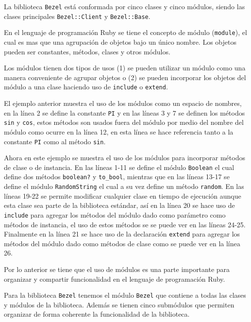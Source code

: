 La biblioteca \texttt{Bezel} está conformada por cinco clases y cinco módulos,
siendo las clases principales \texttt{Bezel::Client} y \texttt{Bezel::Base}.

En el lenguaje de programación Ruby se tiene el concepto de módulo (\texttt{module}),
el cual es mas que una agrupación de objetos bajo un único nombre. Los objetos
pueden ser constantes, métodos, clases y otros módulos.

Los módulos tienen dos tipos de usos (1) se pueden utilizar un módulo como una
manera conveniente de agrupar objetos o (2) se pueden incorporar los objetos del
módulo a una clase haciendo uso de \texttt{include} o \texttt{extend}.



El ejemplo anterior muestra el uso de los módulos como un espacio de nombres,
en la línea 2 se define la constante \texttt{PI} y en las líneas 3 y 7 se definen
los métodos \texttt{sin} y \texttt{cos}, estos métodos son usados fuera del
módulo por medio del nombre del módulo como ocurre en la línea 12, en esta
línea se hace referencia tanto a la constante \texttt{PI} como al método
\texttt{sin}.



Ahora en este ejemplo se muestra el uso de los módulos para incorporar métodos
de clase o de instancia. En las líneas 1-11 se define el módulo \texttt{Boolean}
el cual define dos métodos \texttt{boolean?} y \texttt{to\_bool}, mientras que
en las líneas 13-17 se define el módulo \texttt{RandomString} el cual a su vez
define un método \texttt{random}. En las líneas 19-22 se permite modificar cualquier
clase en tiempo de ejecución aunque esta clase sea parte de la biblioteca estándar,
así en la línea 20 se hace uso de \texttt{include} para agregar los métodos del
módulo dado como parámetro como métodos de instancia, el uso de estos métodos se
se puede ver en las líneas 24-25. Finalmente en la línea 21 se hace uso de la
declaración \texttt{extend} para agregar los métodos del módulo dado como métodos
de clase como se puede ver en la línea 26.

Por lo anterior se tiene que el uso de módulos es una parte importante para
organizar y compartir funcionalidad en el lenguaje de programación Ruby.

Para la biblioteca \texttt{Bezel} tenemos el módulo \texttt{Bezel} que contiene
a todas las clases y módulos de la biblioteca. Además se tienen cinco submódulos
que permiten organizar de forma coherente la funcionalidad de la biblioteca.

